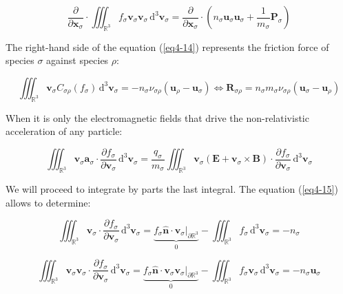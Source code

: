\begin{equation}
    \frac{\partial}{\partial\mathbf{x}_\sigma}\cdot\iiint_{\mathbb{R}^3}f_\sigma\mathbf{v}_\sigma\mathbf{v}_\sigma\,\mathrm{d}^3\mathbf{v}_\sigma=\frac{\partial}{\partial\mathbf{x}_\sigma}\cdot\left(n_\sigma\mathbf{u}_\sigma\mathbf{u}_\sigma+\frac{1}{m_\sigma}\mathbf{P}_\sigma\right)
\end{equation}

The right-hand side of the equation (\ref{eq4-14}) represents the friction force of species $\sigma$ against species $\rho$:


\begin{equation}
    \iiint_{\mathbb{R}^3}\mathbf{v}_\sigma C_{\sigma\rho}(f_\sigma)\,\mathrm{d}^3\mathbf{v}_\sigma=-n_\sigma\nu_{\sigma\rho}\left(\mathbf{u}_\rho-\mathbf{u}_\sigma\right)\Longleftrightarrow\mathbf{R}_{\sigma\rho}=n_\sigma m_\sigma\nu_{\sigma\rho}\left(\mathbf{u}_\sigma-\mathbf{u}_\rho\right)
\end{equation}

When it is only the electromagnetic fields that drive the non-relativistic acceleration of any particle:

\begin{equation}
    \iiint_{\mathbb{R}^3}\mathbf{v}_\sigma\mathbf{a}_\sigma\cdot\frac{\partial f_\sigma}{\partial\mathbf{v}_\sigma}\,\mathrm{d}^3\mathbf{v}_\sigma=\frac{q_\sigma}{m_\sigma}\iiint_{\mathbb{R}^3}\mathbf{v}_\sigma\left(\mathbf{E}+\mathbf{v}_\sigma\times\mathbf{B}\right)\cdot\frac{\partial f_\sigma}{\partial\mathbf{v}_\sigma}\,\mathrm{d}^3\mathbf{v}_\sigma
\end{equation}

We will proceed to integrate by parts the last integral. The equation (\ref{eq4-15}) allows to determine:

\begin{equation}
    \iiint_{\mathbb{R}^3}\mathbf{v}_\sigma\cdot\frac{\partial f_\sigma}{\partial \mathbf{v}_\sigma}\,\mathrm{d}^3\mathbf{v}_\sigma=\underbrace{f_\sigma\mathbf{\hat{n}}\cdot\mathbf{v}_\sigma\bigr|_{\partial\mathbb{R}^3}}_0-\iiint_{\mathbb{R}^3}f_\sigma\,\mathrm{d}^3\mathbf{v}_\sigma=-n_\sigma
\end{equation}

\begin{equation}
    \iiint_{\mathbb{R}^3}\mathbf{v}_\sigma\mathbf{v}_\sigma\cdot\frac{\partial f_\sigma}{\partial\mathbf{v}_\sigma}\,\mathrm{d}^3\mathbf{v}_\sigma=\underbrace{f_\sigma\mathbf{\hat{n}}\cdot\mathbf{v}_\sigma\mathbf{v}_\sigma\bigr|_{\partial\mathbb{R}^3}}_0-\iiint_{\mathbb{R}^3}f_\sigma\mathbf{v}_\sigma\,\mathrm{d}^3\mathbf{v}_\sigma=-n_\sigma\mathbf{u}_\sigma
\end{equation}

